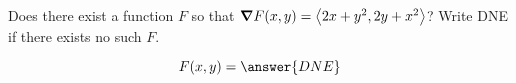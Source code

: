 \documentclass{ximera}
\author{David Guichard \and Neal Koblitz \and H. Jerome Keisler \and Albert Scheller \and Barry Balof \and Mike Wills \and Matthew Carr}
\begin{document}
\begin{exercise}




Does there exist a function $F$ so that $\boldsymbol\nabla F(x,y)=\left\langle 2x+y^2,2y+x^2\right\rangle$? Write DNE if there exists no such $F$.

\begin{prompt}
\[
F(x,y)=\answer{DNE}
\]
\end{prompt}
\end{exercise}
\end{document}
